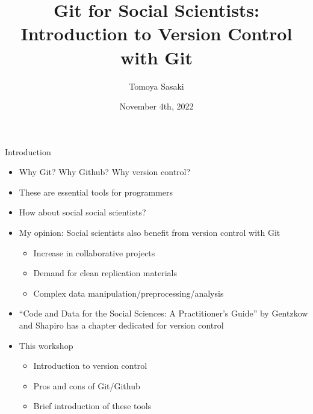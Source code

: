 \documentclass[handout,pdftex,10pt,aspectratio=169]{beamer}
\title[Git workshop]{Git for Social Scientists: \\ Introduction to Version Control with Git}
\author[Tomoya]{Tomoya Sasaki}
\institute[MIT]{Massachusetts Institute of Technology}
\date[Fall 2022]{November 4th, 2022}
\begin{document}
\begin{frame}
\titlepage
\end{frame}
 
\begin{frame}{Introduction}
  \begin{itemize}  \setlength\itemsep{-3pt}
    \item Why Git? Why Github? Why version control?
    \item These are essential tools for programmers
    \item How about social social scientists?
    \item My opinion: Social scientists also benefit from version control with Git \vspace{-5pt}
    \begin{itemize} \setlength\itemsep{-5pt}
      \item Increase in collaborative projects
      \item Demand for clean replication materials
      \item Complex data manipulation/preprocessing/analysis
    \end{itemize}
    \item ``Code and Data for the Social Sciences: A Practitioner's Guide''
    by Gentzkow and Shapiro has a chapter dedicated for version control
    \medskip
    \item This workshop \vspace{-5pt}
    \begin{itemize} \setlength\itemsep{-5pt}
      \item Introduction to version control
      \item Pros and cons of Git/Github
      \item Brief introduction of these tools
    \end{itemize}
  \end{itemize}
\end{frame}
\end{document}
